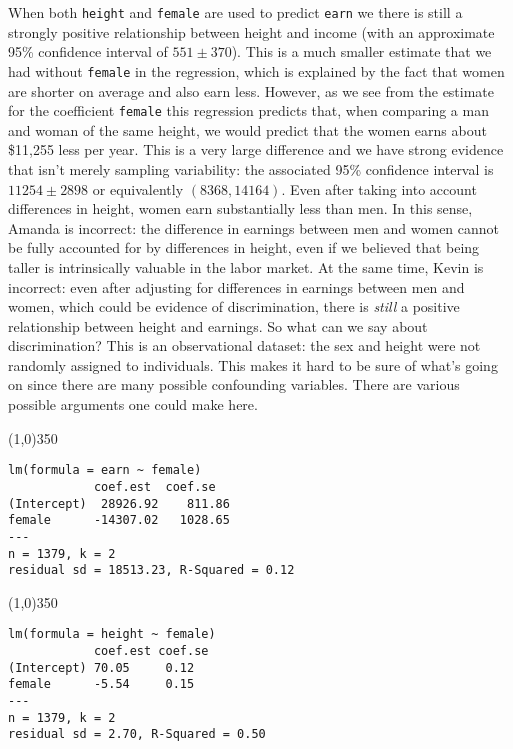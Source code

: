\documentclass[addpoints,12pt]{exam}
\begin{document}
\begin{questions}
\begin{parts}
\begin{solution}
    When both \texttt{height} and \texttt{female} are used to predict \texttt{earn} we there is still a strongly positive relationship between height and income (with an approximate 95\% confidence interval of $551 \pm 370$).
    This is a much smaller estimate that we had without \texttt{female} in the regression, which is explained by the fact that women are shorter on average and also earn less.
    However, as we see from the estimate for the coefficient \texttt{female} this regression predicts that, when comparing a man and woman of the same height, we would predict that the women earns about \$11,255 less per year.
    This is a very large difference and we have strong evidence that isn't merely sampling variability: the associated 95\% confidence interval is $11254 \pm 2898$ or equivalently $(8368, 14164)$.
    Even after taking into account differences in height, women earn substantially less than men.
    In this sense, Amanda is incorrect: the difference in earnings between men and women cannot be fully accounted for by differences in height, even if we believed that being taller is intrinsically valuable in the labor market.
    At the same time, Kevin is incorrect: even after adjusting for differences in earnings between men and women, which could be evidence of discrimination, there is \emph{still} a positive relationship between height and earnings.
    So what can we say about discrimination?
    This is an observational dataset: the sex and height were not randomly assigned to individuals.
    This makes it hard to be sure of what's going on since there are many possible confounding variables.
    There are various possible arguments one could make here. 
  \end{solution}
\end{parts}
\end{questions}

\newpage
\thispagestyle{empty}
\small


\noindent\line(1,0){350}
\begin{verbatim}
lm(formula = earn ~ female)
            coef.est  coef.se  
(Intercept)  28926.92    811.86
female      -14307.02   1028.65
---
n = 1379, k = 2
residual sd = 18513.23, R-Squared = 0.12
\end{verbatim}

\noindent\line(1,0){350}

\begin{verbatim}
lm(formula = height ~ female)
            coef.est coef.se
(Intercept) 70.05     0.12  
female      -5.54     0.15  
---
n = 1379, k = 2
residual sd = 2.70, R-Squared = 0.50
\end{verbatim}
\end{document}
